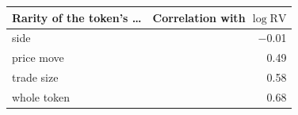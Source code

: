 \begin{tabular}{lr}
\toprule
Rarity of the token's \ldots & Correlation with $\log\mathrm{RV}$ \\
\midrule
side & $-$0.01 \\
price move & 0.49 \\
trade size & 0.58 \\
whole token & 0.68 \\
\bottomrule
\end{tabular}
